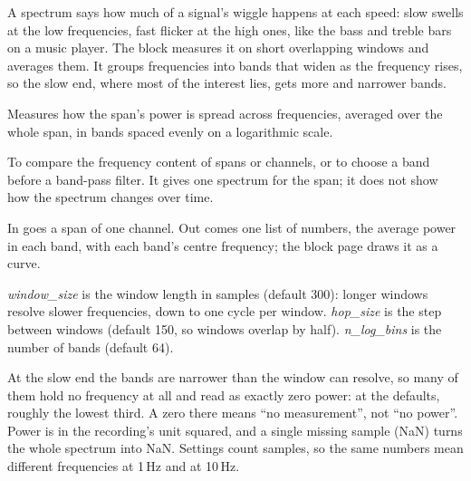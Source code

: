 \begin{plainterms}[A spectrum]
A spectrum says how much of a signal's wiggle happens at each speed: slow swells at the low
frequencies, fast flicker at the high ones, like the bass and treble bars on a music
player. The block measures it on short overlapping windows and averages them. It groups
frequencies into bands that widen as the frequency rises, so the slow end, where most of
the interest lies, gets more and narrower bands.
\end{plainterms}

Measures how the span's power is spread across frequencies, averaged over the whole span,
in bands spaced evenly on a logarithmic scale.

To compare the frequency content of spans or channels, or to choose a band before a
band-pass filter. It gives one spectrum for the span; it does not show how the spectrum
changes over time.

In goes a span of one channel. Out comes one list of numbers, the average power in each
band, with each band's centre frequency; the block page draws it as a curve.

\emph{window\_size} is the window length in samples (default 300): longer windows resolve
slower frequencies, down to one cycle per window. \emph{hop\_size} is the step between
windows (default 150, so windows overlap by half). \emph{n\_log\_bins} is the number of
bands (default 64).

At the slow end the bands are narrower than the window can resolve, so many of them hold no
frequency at all and read as exactly zero power: at the defaults, roughly the lowest third.
A zero there means ``no measurement'', not ``no power''. Power is in the recording's unit
squared, and a single missing sample (NaN) turns the whole spectrum into NaN. Settings
count samples, so the same numbers mean different frequencies at 1\,Hz and at 10\,Hz.
